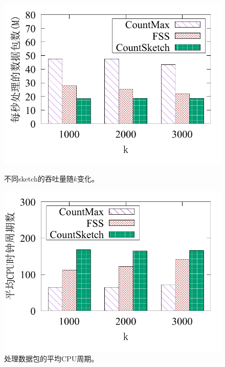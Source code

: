\begin{figure}[!t]
	\centering
	\begin{minipage}[t]{0.48\linewidth}		
		\centering
		\includegraphics[width=\linewidth]{fig/throughput.pdf}
		\caption{\textnormal{不同sketch的吞吐量随$k$变化。}}
		\label{fig:prototype,bandwidth}
	\end{minipage}\vspace{-0.6em}\hspace{0.4em}
	\begin{minipage}[t]{0.48\linewidth}
	\centering
        \includegraphics[width=\linewidth]{fig/k_cpu_2000.pdf}
        \caption{\textnormal{处理数据包的平均CPU周期。}}
        \label{fig:prototype,cycle}
	\end{minipage}\vspace{-0.6em}
\end{figure}


